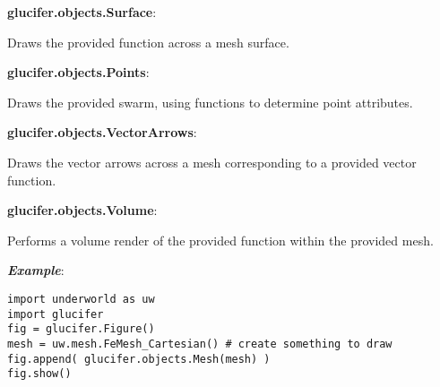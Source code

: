 \documentclass[10pt,landscape]{article}
\begin{document}
\begin{multicols}{2}
\noindent\textbf{glucifer.objects.Surface}:
\begin{addmargin}[1em]{2em}
Draws the provided function across a mesh surface.
\end{addmargin}

\noindent\textbf{glucifer.objects.Points}:
\begin{addmargin}[1em]{2em}
Draws the provided swarm, using functions to determine point attributes.
\end{addmargin}

\noindent\textbf{glucifer.objects.VectorArrows}:
\begin{addmargin}[1em]{2em}
Draws the vector arrows across a mesh corresponding to a provided vector function.
\end{addmargin}

\noindent\textbf{glucifer.objects.Volume}:
\begin{addmargin}[1em]{2em}
Performs a volume render of the provided function within the provided mesh.
\end{addmargin}


\vspace{2mm}
\noindent\textbf{\textit{Example}}:
\begin{lstlisting}
import underworld as uw
import glucifer
fig = glucifer.Figure()
mesh = uw.mesh.FeMesh_Cartesian() # create something to draw
fig.append( glucifer.objects.Mesh(mesh) )
fig.show()
\end{lstlisting}

\end{multicols}
\end{document}
